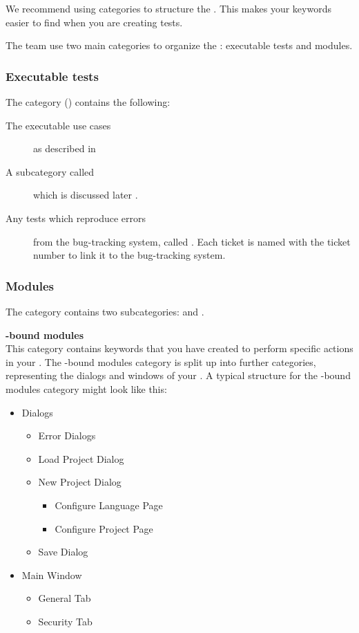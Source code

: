 We recommend using categories  to structure the \gdtestcasebrowser{}. This makes your keywords easier to find when you are creating tests. 

The \gd{} team use two main categories to organize the \gdtestcasebrowser{}: executable tests and modules. 

\subsubsection{Executable tests}
The  category () contains the following:
\begin{description}
\item [The executable use cases]{as described in }
\item [A subcategory called \bxname{\gdehandlers{}}]{which is discussed later }.
\item [Any tests which reproduce errors]{ from the bug-tracking system, called . Each ticket \gdcase{} is named with the ticket number to link it to the bug-tracking system. }
\end{description}

\subsubsection{Modules}
The  category contains two subcategories:  and . 

\textbf{\gdaut{}-bound modules}\\
This category contains keywords that you have created to perform specific actions in your \gdaut{}. The \gdaut{}-bound modules category is split up into further categories, representing the dialogs and windows of your \gdaut{}. A typical structure for the \gdaut{}-bound modules category might look like this:
\begin{itemize}
\item Dialogs
\begin{itemize}
\item Error Dialogs
\item Load Project Dialog
\item New Project Dialog
\begin{itemize}
\item Configure Language Page
\item Configure Project Page
\end{itemize}
\item Save Dialog
\end{itemize}
\item Main Window
\begin{itemize}
\item General Tab
\item Security Tab
\end{itemize}
\end{itemize}

